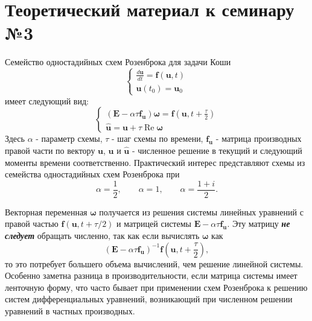 \section{Теоретический материал к семинару №3}
Семейство одностадийных схем Розенброка для задачи Коши
\begin{equation} \label{c3eq1}
	\begin{cases}
		\displaystyle \frac{d\mathbf{u}}{dt} = \mathbf{f} \left( \mathbf{u}, t \right) \\
		\mathbf{u}(t_0) = \mathbf{u}_0
	\end{cases}
\end{equation}
имеет следующий вид:
\begin{equation} \label{c3eq2}
	\begin{cases}
		\displaystyle \left( \mathbf{E} - \alpha \tau \mathbf{f_u} \right) \boldsymbol{\omega}= \mathbf{f} \left( \mathbf{u}, t + \frac{\tau}{2} \right) \\
		\mathbf{\hat{u}} = \mathbf{u} + \tau \operatorname{Re} \boldsymbol{\omega}
	\end{cases}
\end{equation}
Здесь $\alpha$ - параметр схемы, $\tau$ - шаг схемы по времени, $\mathbf{f_u}$ - матрица производных правой части по вектору $\mathbf{u}$, $\mathbf{u}$ и $\mathbf{\hat{u}}$ - численное решение в текущий и следующий моменты времени соответственно. Практический интерес представляют схемы из семейства одностадийных схем Розенброка при  
\begin{equation} \nonumber
\alpha = \frac{1}{2},
\qquad
\alpha = 1,
\qquad
\alpha = \frac{1+i}{2}.
\end{equation}

Векторная переменная $\boldsymbol{\omega}$ получается из решения системы линейных уравнений с правой частью $\mathbf{f} \left( \mathbf{u}, t + \tau/2 \right)$ и матрицей системы $\mathbf{E} - \alpha \tau \mathbf{f_u}$. Эту матрицу \textbf{\textit{не следует}} обращать численно, так как если вычислять  $\boldsymbol{\omega}$ как 
\begin{equation} \nonumber
	\left( \mathbf{E} - \alpha \tau \mathbf{f_u} \right)^{-1} \mathbf{f} \left( \mathbf{u}, t + \frac{\tau}{2} \right),
\end{equation}
то это потребует большего объема вычислений, чем решение линейной системы. Особенно заметна разница в производительности, если матрица системы имеет ленточную форму, что часто бывает при применении схем Розенброка к решению систем дифференциальных уравнений, возникающий при численном решении уравнений в частных производных.

